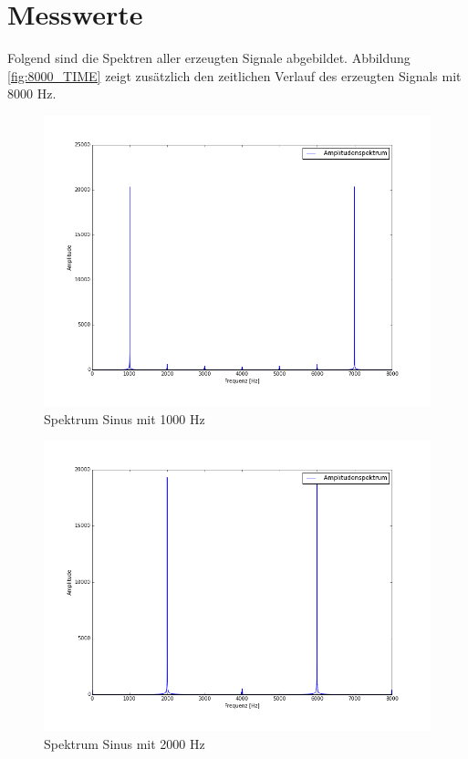 \documentclass[12pt,oneside,a4paper]{report}
\begin{document}
\section{Messwerte}
\label{chap:VERSUCH_4_MESSWERTE}

Folgend sind die Spektren aller erzeugten Signale abgebildet.
Abbildung \ref{fig:8000_TIME} zeigt zusätzlich den zeitlichen Verlauf des erzeugten Signals mit 8000 Hz.

\begin{figure}[H]
\centering\small
\includegraphics[scale=0.4]{src/1000fft.png}
\caption{Spektrum Sinus mit 1000 Hz}
\label{fig:1000_FFT}
\end{figure}

\begin{figure}[H]
\centering\small
\includegraphics[scale=0.4]{src/2000fft.png}
\caption{Spektrum Sinus mit 2000 Hz}
\label{fig:2000_FFT}
\end{figure}
\end{document}
